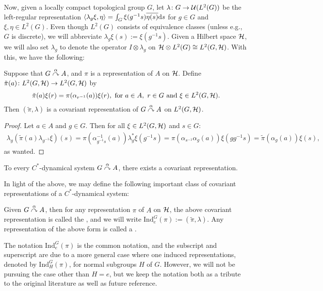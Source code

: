 Now, given a locally compact topological group $G$, let $\lambda \colon G \to \mathcal{U}(L^2(G))$ be the left-regular representation $\langle \lambda_g \xi, \eta\rangle = \int_G \xi(g^{-1}s)\overline{\eta(s)}\mathrm{d} s$ for $g \in G$ and $\xi, \eta \in L^2(G)$. Even though $L^2(G)$ consists of equivalence classes (unless e.g., $G$ is discrete), we will abbreviate $\lambda_g \xi(s) := \xi(g^{-1}s)$. Given a Hilbert space $\mathcal{H}$, we will also set $\lambda_g$ to denote the operator $I \otimes \lambda_g$ on $\mathcal{H} \otimes L^2(G) \cong L^2(G,\mathcal{H})$. With this, we have the following:
\begin{lemma}
Suppose that $G \stackrel{\alpha}{\curvearrowright} A$, and $\pi$ is a representation of $A$ on $\mathcal{H}$. Define $\tilde{\pi}(a) \colon L^2(G,\mathcal{H}) \to L^2(G,\mathcal{H})$ by 
\begin{align*}
	\tilde{\pi}(a)\xi(r) = \pi(\alpha_{r^{-1}}(a))\xi(r), \text{ for } a \in A, \ r \in G \text{ and } \xi \in L^2(G,\mathcal{H}).
\end{align*}
Then $(\tilde{\pi},\lambda)$ is a covariant representation of $G \stackrel{\alpha}{\curvearrowright} A$ on $L^2(G,\mathcal{H})$.
\label{cross:regularrep}
\end{lemma}
\begin{proof}
Let $a \in A$ and $g \in G$. Then for all $\xi \in L^2(G,\mathcal{H})$ and $s \in G$:
\begin{align*}
	\lambda_g (\tilde{\pi}(a) \lambda_{g^{-1}} \xi)(s) = \pi(\alpha_{g^{-1}s}^{-1}(a))\lambda_g^* \xi(g^{-1}s) = \pi(\alpha_{s^{-1}}\alpha_g(a))\xi (g g^{-1} s) = \tilde{\pi}(\alpha_g(a))\xi(s),
\end{align*}
as wanted.
\end{proof}
\begin{corollary}
To every $C^*$-dynamical system $G \stackrel{\alpha}{\curvearrowright} A$, there exists a covariant representation.
\end{corollary}
In light of the above, we may define the following important class of covariant representations of a $C^*$-dynamical system:
\begin{definition}
Given $G \stackrel{\alpha}{\curvearrowright} A$, then for any representation $\pi$ of $A$ on $\mathcal{H}$, the above covariant representation is called the , and we will write $\mathrm{Ind}_e^G(\pi) := (\tilde{\pi}, \lambda)$. Any representation of the above form is called a .
\end{definition}
\begin{remark}
	The notation $\mathrm{Ind}_e^G(\pi)$ is the common notation, and the subscript and superscript are due to a more general case where one induced representations, denoted by $\mathrm{Ind}_H^G(\pi)$, for normal subgroups $H$ of $G$. However, we will not be pursuing the case other than $H= e$, but we keep the notation both as a tribute to the original literature as well as future reference.
\end{remark}
